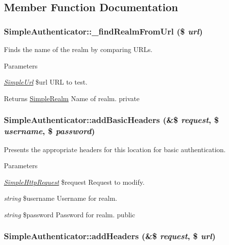 \subsection{Member Function Documentation}
\hypertarget{class_simple_authenticator_a16cd31f6a2794295e7e3a9d9cf70eec2}{
\subsubsection[{\_\-findRealmFromUrl}]{\setlength{\rightskip}{0pt plus 5cm}SimpleAuthenticator::\_\-findRealmFromUrl (\$ {\em url})}}
\label{class_simple_authenticator_a16cd31f6a2794295e7e3a9d9cf70eec2}
Finds the name of the realm by comparing URLs. 
\begin{DoxyParams}{Parameters}
\item[{\em \hyperlink{class_simple_url}{SimpleUrl}}]\$url URL to test. \end{DoxyParams}
\begin{DoxyReturn}{Returns}
\hyperlink{class_simple_realm}{SimpleRealm} Name of realm.  private 
\end{DoxyReturn}
\hypertarget{class_simple_authenticator_a8ab949ba2187ae43c740b3b2001ae32d}{
\subsubsection[{addBasicHeaders}]{\setlength{\rightskip}{0pt plus 5cm}SimpleAuthenticator::addBasicHeaders (\&\$ {\em request}, \/  \$ {\em username}, \/  \$ {\em password})}}
\label{class_simple_authenticator_a8ab949ba2187ae43c740b3b2001ae32d}
Presents the appropriate headers for this location for basic authentication. 
\begin{DoxyParams}{Parameters}
\item[{\em \hyperlink{class_simple_http_request}{SimpleHttpRequest}}]\$request Request to modify. \item[{\em string}]\$username Username for realm. \item[{\em string}]\$password Password for realm.  public \end{DoxyParams}
\hypertarget{class_simple_authenticator_a452ef4613fe6b053cf086d4e31dfefb0}{
\subsubsection[{addHeaders}]{\setlength{\rightskip}{0pt plus 5cm}SimpleAuthenticator::addHeaders (\&\$ {\em request}, \/  \$ {\em url})}}
